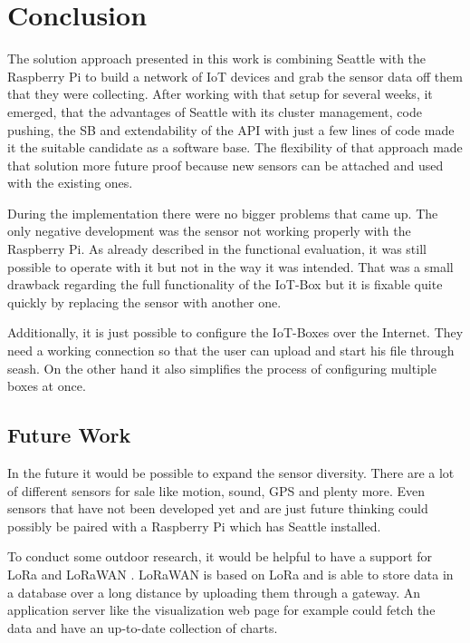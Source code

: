 \documentclass[bachelorthesis, grey, english]{mas-thesis-chapters} %
\begin{document}
\section{Conclusion}

The solution approach presented in this work is combining Seattle with the Raspberry Pi to build a network of \gls{IoT} devices and grab the sensor data off them that they were collecting. After working with that setup for several weeks, it emerged, that the advantages of Seattle with its cluster management, code pushing, the \gls{SB} and extendability of the API with just a few lines of code made it the suitable candidate as a software base. The flexibility of that approach made that solution more future proof because new sensors can be attached and used with the existing ones.

During the implementation there were no bigger problems that came up. The only negative development was the sensor not working properly with the Raspberry Pi. As already described in the functional evaluation, it was still possible to operate with it but not in the way it was intended. That was a small drawback regarding the full functionality of the \gls{IoT}-Box but it is fixable quite quickly by replacing the sensor with another one.

Additionally, it is just possible to configure the \gls{IoT}-Boxes over the Internet. They need a working connection so that the user can upload and start his file through \gls{seash}. On the other hand it also simplifies the process of configuring multiple boxes at once.

\subsection{Future Work}

In the future it would be possible to expand the sensor diversity. There are a lot of different sensors for sale like motion, sound, GPS and plenty more. Even sensors that have not been developed yet and are just future thinking could possibly be paired with a Raspberry Pi which has Seattle installed. 

To conduct some outdoor research, it would be helpful to have a support for LoRa and LoRaWAN \cite{lora}. LoRaWAN is based on LoRa and is able to store data in a database over a long distance by uploading them through a gateway. An application server like the visualization web page for example could fetch the data and have an up-to-date collection of charts.

\printbibliography[heading=bibintoc]

\end{document}
